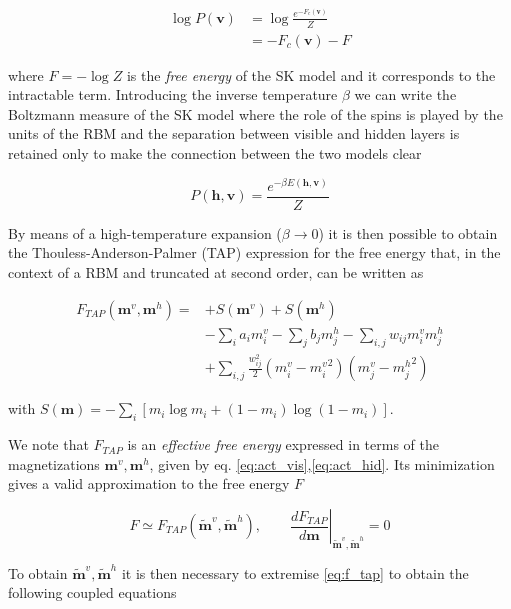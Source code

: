 \documentclass[notitlepage]{revtex4-1}
\begin{document}
\begin{align}
\log P(\mathbf{v}) &= \log \frac{e^{-F_c(\mathbf{v})}}{Z} \\ \nonumber
&= -F_c(\mathbf{v}) - F
\end{align}

where \( \textstyle F = - \log Z \) is the \textit{free energy} of the SK model and it corresponds to the intractable term. Introducing the inverse temperature \(\beta\) we can write the Boltzmann measure of the SK model where the role of the spins is played by the units of the RBM and the separation between visible and hidden layers is retained only to make the connection between the two models clear

\begin{equation}
P(\textbf{h},\textbf{v}) = \frac{e^{- \beta E(\textbf{h},\textbf{v})}}{Z}
\end{equation}

By means of a high-temperature expansion (\(\beta \to 0\)) \cite{ht_exp} it is then possible to obtain the Thouless-Anderson-Palmer (TAP) expression for the free energy \cite{TAP} that, in the context of a RBM and truncated at second order, can be written as

\begin{align}
F_{TAP}(\mathbf{m}^v,\mathbf{m}^h) = &+ S(\mathbf{m}^v) + S(\mathbf{m}^h) \nonumber \\
&- \sum_i a_i m_i^v - \sum_j b_j m_j^h - \sum_{i,j} w_{ij} m_i^v m_j^h \nonumber \\
&+ \sum_{i,j} \frac{w_{ij}^2}{2} \left( m_i^v - {m_i^v}^2 \right) \left(m_j^v - {m_j^h}^2 \right) \label{eq:f_tap}
\end{align}

with \( \textstyle S(\mathbf{m}) = - \sum_i \left[ m_i \log m_i + (1 - m_i) \log (1 - m_i) \right] \).

We note that \(F_{TAP}\) is an \textit{effective free energy} expressed in terms of the magnetizations \(\mathbf{m}^v, \mathbf{m}^h\), given by eq. \eqref{eq:act_vis},\eqref{eq:act_hid}. Its minimization gives a valid approximation to the free energy \(F\)

\begin{equation}
F \simeq F_{TAP}(\mathbf{\tilde{m}}^v, \mathbf{\tilde{m}}^h), \qquad \left. \frac{dF_{TAP}}{d \mathbf{m}} \right\rvert_{\mathbf{\tilde{m}}^v, \mathbf{\tilde{m}}^h} = 0
\label{eq:f_approx}
\end{equation}

To obtain \(\mathbf{\tilde{m}}^v, \mathbf{\tilde{m}}^h\) it is then necessary to extremise \eqref{eq:f_tap} to obtain the following coupled equations
\end{document}
